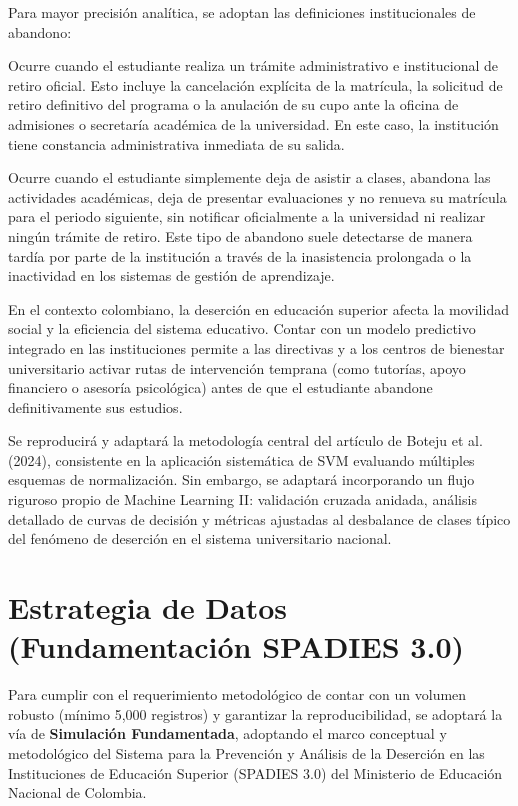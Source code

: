 \documentclass[12pt,a4paper]{article}
\begin{document}
Para mayor precisión analítica, se adoptan las definiciones institucionales de abandono:
\begin{description}[style=multiline, leftmargin=3.5cm]
    \item[Abandono formal:] Ocurre cuando el estudiante realiza un trámite administrativo e institucional de retiro oficial. Esto incluye la cancelación explícita de la matrícula, la solicitud de retiro definitivo del programa o la anulación de su cupo ante la oficina de admisiones o secretaría académica de la universidad. En este caso, la institución tiene constancia administrativa inmediata de su salida.
    \item[Abandono informal (Deserción silenciosa):] Ocurre cuando el estudiante simplemente deja de asistir a clases, abandona las actividades académicas, deja de presentar evaluaciones y no renueva su matrícula para el periodo siguiente, sin notificar oficialmente a la universidad ni realizar ningún trámite de retiro. Este tipo de abandono suele detectarse de manera tardía por parte de la institución a través de la inasistencia prolongada o la inactividad en los sistemas de gestión de aprendizaje.
\end{description}

En el contexto colombiano, la deserción en educación superior afecta la movilidad social y la eficiencia del sistema educativo. Contar con un modelo predictivo integrado en las instituciones permite a las directivas y a los centros de bienestar universitario activar rutas de intervención temprana (como tutorías, apoyo financiero o asesoría psicológica) antes de que el estudiante abandone definitivamente sus estudios.

Se reproducirá y adaptará la metodología central del artículo de Boteju et al. (2024), consistente en la aplicación sistemática de SVM evaluando múltiples esquemas de normalización. Sin embargo, se adaptará incorporando un flujo riguroso propio de Machine Learning II: validación cruzada anidada, análisis detallado de curvas de decisión y métricas ajustadas al desbalance de clases típico del fenómeno de deserción en el sistema universitario nacional.

\section{Estrategia de Datos (Fundamentación SPADIES 3.0)}

Para cumplir con el requerimiento metodológico de contar con un volumen robusto (mínimo 5,000 registros) y garantizar la reproducibilidad, se adoptará la vía de \textbf{Simulación Fundamentada}, adoptando el marco conceptual y metodológico del Sistema para la Prevención y Análisis de la Deserción en las Instituciones de Educación Superior (SPADIES 3.0) del Ministerio de Educación Nacional de Colombia.
\end{document}
